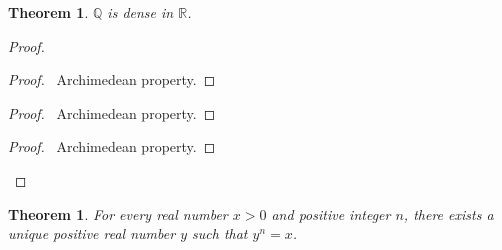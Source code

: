 \documentclass{book}
\let\qed\relax
\newtheorem{thm}[prop]{Theorem}
\theoremstyle{definition}
\begin{document}
\begin{thm}
$\mathbb{Q}$ is dense in $\mathbb{R}$.
\end{thm}

\begin{proof}
\pf
{}
\begin{proof}
	\pf\ Archimedean property.
\end{proof}
\begin{proof}
	\pf\ Archimedean property.
\end{proof}
\begin{proof}
	\pf\ Archimedean property.
\end{proof}
\qed
\end{proof}

\begin{thm}
For every real number $x > 0$ and positive integer $n$, there exists a unique positive real number $y$ such that $y^n = x$.
\end{thm}
\end{document}
